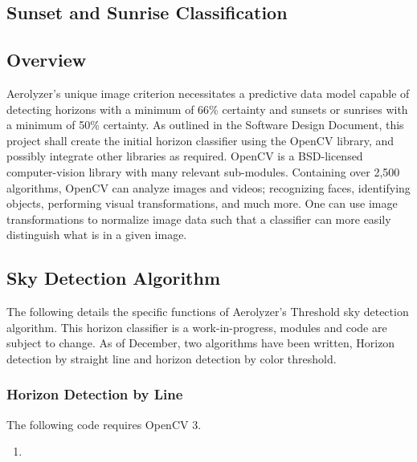 \documentclass[onecolumn, draftclsnofoot,10pt, compsoc]{IEEEtran}
\begin{document}
\begin{singlespace}

\section{Sunset and Sunrise Classification}
	\subsection{Overview}
		Aerolyzer’s unique image criterion necessitates a predictive data model capable of detecting horizons with a minimum of 66\% certainty and sunsets or sunrises with a minimum of 50\% certainty.
		As outlined in the Software Design Document, this project shall create the initial horizon classifier using the OpenCV library, and possibly integrate other libraries as required.		
		OpenCV is a BSD-licensed computer-vision library with many relevant sub-modules.
		Containing over 2,500 algorithms, OpenCV can analyze images and videos; recognizing faces, identifying objects, performing visual transformations, and much more.
		One can use image transformations to normalize image data such that a classifier can more easily distinguish what is in a given image.
		
	\subsection{Sky Detection Algorithm}
	The following details the specific functions of Aerolyzer's Threshold sky detection algorithm.
	This horizon classifier is a work-in-progress, modules and code are subject to change.
	As of December, two algorithms have been written, Horizon detection by straight line and horizon detection by color threshold.
	
	\subsubsection{Horizon Detection by Line}
		The following code requires OpenCV 3.
		
		
		
		\begin{enumerate}
			\item 
		\end{enumerate}


\end{singlespace}
\end{document}
